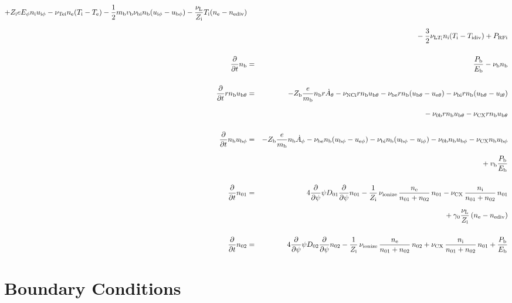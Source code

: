 \documentclass[11pt]{article}
\def\r#1{{\rm#1}}
\def\ddt{\frac{\partial}{\partial t}}
\def\ddp{\frac{\partial}{\partial \psi}}
\def\mb{m_\r{b}}
\def\ne{n_\r{e}}
\def\ni{n_\r{i}}
\def\nb{n_\r{b}}
\def\ueth{u_{\r{e}\theta}}
\def\uith{u_{\r{i}\theta}}
\def\ubth{u_{\r{b}\theta}}
\def\ueph{u_{\r{e}\phi}}
\def\uiph{u_{\r{i}\phi}}
\def\ubph{u_{\r{b}\phi}}
\def\Eph{E_\phi}
\def\Athd{\dot{A}_\theta}
\def\Aphd{\dot{A}_\phi}
\def\Te{T_\r{e}}
\def\Ti{T_\r{i}}
\def\nna{n_{01}}
\def\nnb{n_{02}}
\def\Zi{Z_\r{i}}
\def\Zb{Z_\r{b}}
\def\Pb{P_\r{b}}
\def\Eb{E_\r{b}}
\def\PRFi{P_\r{RFi}}
\def\nuNCi{\nu_\r{NCi}}
\def\nube{\nu_\r{be}}
\def\nubi{\nu_\r{bi}}
\def\nunb{\nu_\r{0b}}
\def\nuL{\nu_\r{L}}
\def\nuCX{\nu_\r{CX}}
\def\nuion{\nu_\r{ionize}}
\def\nub{\nu_\r{b}}
\def\nuTei{\nu_\r{Tei}}
\def\vb{v_\r{b}}
\def\nediv{n_\r{ediv}}
\def\Tidiv{T_\r{idiv}}
\def\nuLTi{\nu_{\r{L}T_\r{i}}}
\begin{document}
\begin{eqnarray}
%
  + \Zi e \Eph \ni \uiph
%
  - \nuTei \ne (\Ti - \Te)
%
  - \frac{1}{2} \mb \vb \nubi \nb (\uiph - \ubph)
%
  - \frac{\nuL}{\Zi} \Ti (\ne - \nediv)
\nonumber\\[2.5mm]&&{}
%
  - \frac{3}{2} \nuLTi \ni (\Ti - \Tidiv)
%
  + \PRFi
\\[5mm]
%
%
  \ddt \nb &=&
%
    \frac{\Pb}{\Eb}
%
  - \nub \nb
\\[5mm]
%
%
  \ddt r \nb \ubth &=&
%
  - \Zb \frac{e}{\mb} \nb r \Athd
%
  - \nuNCi r \nb \ubth
%
  - \nube r \nb (\ubth - \ueth)
%
  - \nubi r \nb (\ubth - \uith)
\nonumber\\[2.5mm]&&{}
%
  - \nunb r \nb \ubth
%
  - \nuCX r \nb \ubth
\\[5mm]
%
%
  \ddt \nb \ubph &=&
%
  - \Zb \frac{e}{\mb} \nb \Aphd
%
  - \nube \nb (\ubph - \ueph)
%
  - \nubi \nb (\ubph - \uiph)
%
  - \nunb \nb \ubph
%
  - \nuCX \nb \ubph
\nonumber\\[2.5mm]&&{}
%
  + \vb \frac{\Pb}{\Eb}
\\[5mm]
%
%
  \ddt \nna &=& 
%
    4 \ddp \psi D_{01} \ddp \nna
%
  - \frac{1}{\Zi}\, \nuion\, \frac{\ne}{\nna+\nnb}\, \nna
%
  - \nuCX\, \frac{\ni}{\nna+\nnb}\, \nna
\nonumber\\[2.5mm]&&{}
%
  + \gamma_0 \frac{\nuL}{\Zi} \, (\ne - \nediv)
\\[5mm]
%
%
  \ddt \nnb &=& 
%
    4 \ddp \psi D_{02} \ddp \nnb
%
  - \frac{1}{\Zi}\, \nuion\, \frac{\ne}{\nna+\nnb}\, \nnb
%
  + \nuCX\, \frac{\ni}{\nna+\nnb}\, \nna
%
  + \frac{\Pb}{\Eb}
\end{eqnarray}

\bigskip

\section{Boundary Conditions}
\end{document}

